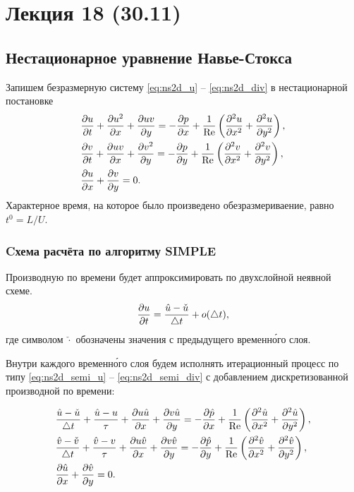 \section{Лекция 18 (30.11)}

\subsection{Нестационарное уравнение Навье-Стокса}
\label{sec:ns2d-nonstat}

Запишем безразмерную систему \eqref{eq:ns2d_u} -- \eqref{eq:ns2d_div} в нестационарной постановке
\begin{equation}
\label{eq:ns2d_nonstat}
\begin{array}{l}
    \dfrac{\partial u}{\partial t} + \dfrac{\partial u^2}{\partial x} + \dfrac{\partial uv}{\partial y} =
        -\dfrac{\partial p}{\partial x}
        + \dfrac{1}{\mathrm{Re}}\left(\dfrac{\partial^2 u}{\partial x^2} + \dfrac{\partial^2 u}{\partial y^2}\right),\\[10pt]
    \dfrac{\partial v}{\partial t} + \dfrac{\partial uv}{\partial x} + \dfrac{\partial v^2}{\partial y} =
        -\dfrac{\partial p}{\partial y}
        + \dfrac{1}{\mathrm{Re}}\left(\dfrac{\partial^2 v}{\partial x^2} + \dfrac{\partial^2 v}{\partial y^2}\right), \\[10pt]
    \dfrac{\partial u}{\partial x} + \dfrac{\partial v}{\partial y} = 0.
\end{array}
\end{equation}
Характерное время, на которое было произведено обезразмериваение,
равно $t^0 = L/U$.

\subsubsection{Cхема расчёта по алгоритму SIMPLE}
\label{sec:simple-nonstat-algo}

Производную по времени будет аппроксимировать по двухслойной неявной схеме.
\begin{equation*}
\frac{\partial u}{\partial t} = \frac{\hat u - \check u}{\triangle t} + o(\triangle t),
\end{equation*}
где символом $\check\cdot$ обозначены значения с предыдущего временн\'{о}го слоя.

Внутри каждого временн\'{о}го слоя будем исполнять
итерационный процесс по типу \eqref{eq:ns2d_semi_u} -- \eqref{eq:ns2d_semi_div}
с добавлением дискретизованной производной по времени:

\begin{equation}
    \label{eq:ns2d_nonstat_semi}
    \begin{array}{l}
    \displaystyle
    \frac{\hat u - \check u}{\triangle t} + \frac{\hat u - u}{\tau} + \frac{\partial u \hat u}{\partial x} + \frac{\partial v \hat u}{\partial y} =
        -\frac{\partial \hat p}{\partial x}
        + \frac{1}{\mathrm{Re}}\left(\frac{\partial^2 \hat u}{\partial x^2} + \frac{\partial^2 \hat u}{\partial y^2}\right), \\[10pt]
    \displaystyle
    \frac{\hat v - \check v}{\triangle t} + \frac{\hat v - v}{\tau} + \frac{\partial u\hat v}{\partial x} + \frac{\partial v \hat v}{\partial y} =
        -\frac{\partial \hat p}{\partial y}
        + \frac{1}{\mathrm{Re}}\left(\frac{\partial^2 \hat v}{\partial x^2} + \frac{\partial^2 \hat v}{\partial y^2}\right),  \\[10pt]
    \displaystyle
    \frac{\partial \hat u}{\partial x} + \frac{\partial \hat v}{\partial y} = 0.
    \end{array}
\end{equation}

